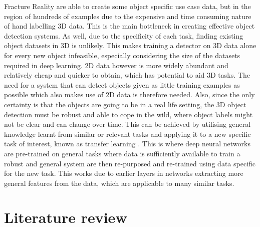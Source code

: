 \documentclass[11pt]{article}
\begin{document}
Fracture Reality are able to create some object specific use case data, but in the region of hundreds of examples due to the expensive and time consuming nature of hand labelling 3D data. This is the main bottleneck in creating effective object detection systems. As well, due to the specificity of each task, finding existing object datasets in 3D is unlikely. This makes training a detector on 3D data alone for every new object infeasible, especially considering the size of the datasets required in deep learning. 2D data however is more widely abundant and relatively cheap and quicker to obtain, which has potential to aid 3D tasks. The need for a system that can detect objects given as little training examples as possible which also makes use of 2D data is therefore needed. Also, since the only certainty is that the objects are going to be in a real life setting, the 3D object detection must be robust and able to cope in the wild, where object labels might not be clear and can change over time. This can be achieved by utilising general knowledge learnt from similar or relevant tasks and applying it to a new specific task of interest, known as transfer learning \cite{DeCAF}. This is where deep neural networks are pre-trained on general tasks where data is sufficiently available to train a robust and general system are then re-purposed and re-trained using data specific for the new task. This works due to earlier layers in networks extracting more general features from the data, which are applicable to many similar tasks.


\section{Literature review}
\end{document}

